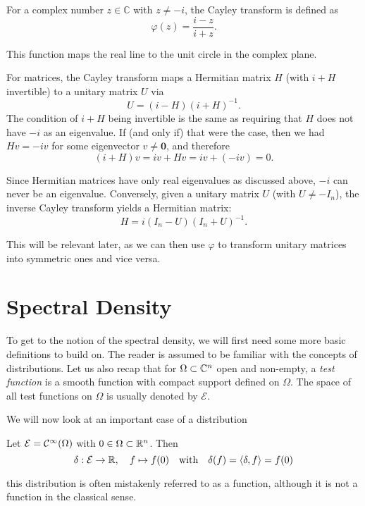 For a complex number $z \in \mathbb{C}$ with $z \neq -i$, the Cayley transform is defined as
\[
\varphi(z) = \frac{i - z}{i + z}.
\]

This function maps the real line to the unit circle in the complex plane.

\vspace{0.5cm}



For matrices, the Cayley transform maps a Hermitian matrix $H$ (with $i + H$ invertible) to a unitary matrix $U$ via
\[
U = (i - H)(i + H)^{-1}.
\]
The condition of $i + H$ being invertible is the same as requiring that $H$ does not have $-i$ as an eigenvalue. If (and only if) that were the case, then we had $H v = -i v$ for some eigenvector $v \neq \mathbf{0}$, and therefore
\[
(i + H) v = i v + H v = i v + (-i v) = 0.
\]

Since Hermitian matrices have only real eigenvalues as discussed above, $-i$ can never be an eigenvalue. Conversely, given a unitary matrix $U$ (with $U \neq -I_n$), the inverse Cayley transform yields a Hermitian matrix:
\[
H = i (I_n - U)(I_n + U)^{-1}.
\]

This will be relevant later, as we can then use $\varphi$ to transform unitary matrices into symmetric ones and vice versa.

\section{Spectral Density}

To get to the notion of the spectral density, we will first need some more basic definitions to build on. The reader is assumed to be familiar with the concepts of distributions. Let us also recap that for $\Omega \subset \mathbb{C}^n$ open and non-empty, a \emph{test function} is a smooth function with compact support defined on $\Omega$. The space of all test functions on $\Omega$ is usually denoted by $\mathcal{E}$.

We will now look at an important case of a distribution

\begin{definition}
    Let $\mathcal{E} = \mathcal{C}^{\infty}(\Omega)$ with $0 \in \Omega \subset \mathbb{R}^n$.
    Then
    \[
    \delta: \mathcal{E} \to \mathbb{R}, \quad f \mapsto f(0) \quad \text{with} \quad \delta(f) = \langle \delta, f \rangle = f(0)
    \]
\end{definition}

this distribution is often mistakenly referred to as a function, although it is not a function in the classical sense.

